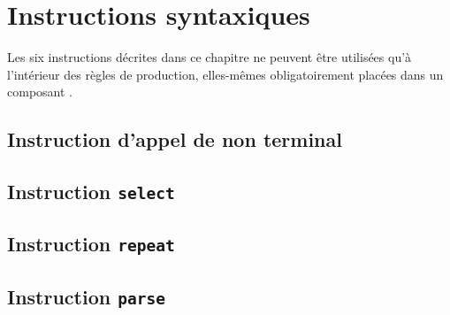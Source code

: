 
\chapter{Instructions syntaxiques}

Les six instructions décrites dans ce chapitre ne peuvent être utilisées qu'à l'intérieur des règles de production, elles-mêmes obligatoirement placées dans un composant .








\section{Instruction d'appel de non terminal}





\section{Instruction \texttt{select}}








\section{Instruction \texttt{repeat}}







\section{Instruction \texttt{parse}}











